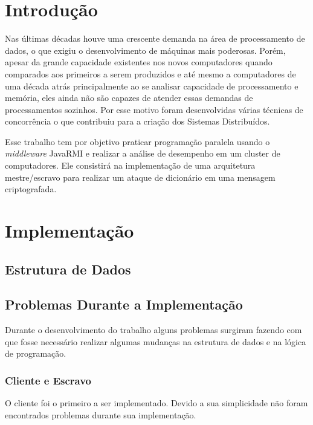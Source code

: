\documentclass[
	12pt,				%
    oneside,			%
	a4paper,			%
	english,			%
	brazil,				%
	]{abntex2}
\begin{document}
\chapter{Introdução} 
Nas últimas décadas houve uma crescente demanda na área de processamento de dados, o que exigiu o desenvolvimento de máquinas
mais poderosas. Porém, apesar da grande capacidade existentes nos novos computadores quando comparados aos primeiros a serem produzidos e até mesmo a computadores de uma década atrás principalmente ao se analisar capacidade de processamento e memória, eles ainda não são capazes de atender essas demandas de processamentos sozinhos. Por esse motivo foram desenvolvidas várias técnicas de concorrência o que contribuiu para a criação dos Sistemas Distribuídos.


Esse trabalho tem por objetivo praticar programação paralela usando o \textit{middleware} JavaRMI e realizar a análise de desempenho em um cluster de computadores. Ele consistirá na implementação de uma arquitetura mestre/escravo para realizar um ataque de dicionário em uma mensagem criptografada.


\chapter{Implementação} 

\section{Estrutura de Dados}


\section{Problemas Durante a Implementação}
Durante o desenvolvimento do trabalho alguns problemas surgiram fazendo com que fosse necessário realizar algumas mudanças
na estrutura de dados e na lógica de programação. 


\subsection{Cliente e Escravo}
O cliente foi o primeiro a ser implementado. Devido a sua simplicidade não foram encontrados problemas durante sua implementação.
\end{document}
